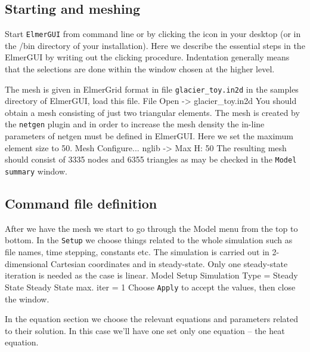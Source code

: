 \subsection*{Starting and meshing}

Start \texttt{ElmerGUI} from command line or by clicking the icon in your desktop (or in the /bin directory of your installation). 
Here we describe the essential steps in the ElmerGUI by writing out the clicking procedure. Indentation generally means that the 
selections are done within the window chosen at the higher level. 

The mesh is given in ElmerGrid format in file \texttt{glacier\_toy.in2d} in the samples directory of ElmerGUI, 
load this file.
\ttbegin
File 
  Open -> glacier\_toy.in2d
\ttend
You should obtain a mesh consisting of just two triangular elements. The mesh is created by the \texttt{netgen} plugin 
and in order to increase the mesh density the in-line parameters of netgen must be defined in ElmerGUI.
Here we set the maximum element size to 50. 
\ttbegin
Mesh
  Configure... 
    nglib -> Max H: 50
\ttend
The resulting mesh should consist of 3335 nodes and 6355 triangles as may be checked in the 
\texttt{Model summary} window.


\subsection*{Command file definition}

After we have the mesh we start to go through the Model menu from the top to bottom. 
In the \texttt{Setup} we choose things related to the whole simulation such as file names, 
time stepping, constants etc.
The simulation is carried out in 2-dimensional Cartesian coordinates and in steady-state. 
Only one steady-state iteration is needed as the case is linear. 
\ttbegin
Model
  Setup 
    Simulation Type = Steady State
    Steady State max. iter = 1
\ttend
Choose \texttt{Apply} to accept the values, then close the window.

In the equation section we choose the relevant equations and parameters related to their solution. 
In this case we'll have one set only one equation -- the heat equation.


